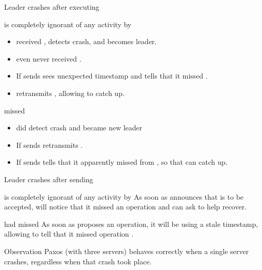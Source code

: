 \begin{slide}{Leader crashes after executing }
  \begin{block}{ is completely ignorant of any activity by }
    \begin{itemize}
    \item {} received , detects crash, and becomes leader.
    \item {} even never received . 
    \item If  sends   sees unexpected timestamp
      and tells  that it missed . 
    \item {} retransmits , allowing  to catch up.
    \end{itemize}
  \end{block}
  \begin{block}{ missed }
    \begin{itemize}
    \item {} did detect crash and became new leader
    \item If  sends   retransmits
      . 
    \item If  sends   tells  that it
      apparently missed  from , so that  can catch up. 
    \end{itemize}
  \end{block}
\end{slide}
\begin{slide}{Leader crashes after sending }
  \begin{block}{ is completely ignorant of any activity by }
    As soon as  announces that  is to be accepted,  will notice that it missed an
    operation and can ask  to help recover.
  \end{block}
  \begin{block}{ had missed }
    As soon as  proposes an operation, it will be using a stale timestamp, allowing  to tell
     that it missed operation .
  \end{block}
  \begin{alertblock}{Observation}
    Paxos (with three servers) behaves correctly when a single server crashes, regardless when that crash took
    place.
  \end{alertblock}
\end{slide}
